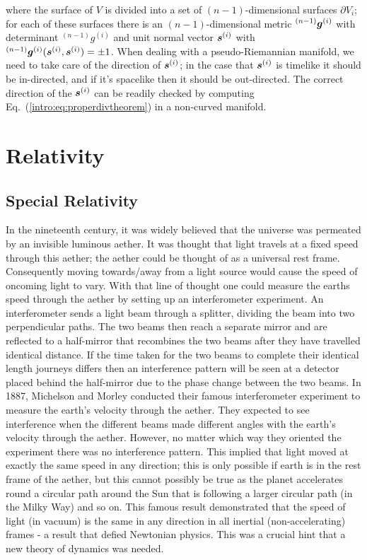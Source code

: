 where the surface of $V$ is divided into a set of $(n-1)$-dimensional surfaces $\partial V_i$; for each of these surfaces there is an $(n-1)$-dimensional metric ${}^{(n-1)}\boldsymbol{g}^{(i)}$ with determinant ${}^{(n-1)} g ^{(i)}$ and unit normal vector $\boldsymbol{s}^{(i)}$ with ${}^{(n-1)}\boldsymbol{g}^{(i)}(\boldsymbol{s}^{(i)},\boldsymbol{s}^{(i)})=\pm 1$. When dealing with a pseudo-Riemannian manifold, we need to take care of the direction of $\boldsymbol{s}^{(i)}$; in the case that $\boldsymbol{s}^{(i)}$ is timelike it should be in-directed, and if it's spacelike then it should be out-directed. The correct direction of the $\boldsymbol{s}^{(i)}$ can be readily checked by computing Eq.~(\ref{intro:eq:properdivtheorem}) in a non-curved manifold.

\newpage
\section{Relativity}

\subsection{Special Relativity}

In the nineteenth century, it was widely believed that the universe was permeated by an invisible luminous aether. It was thought that light travels at a fixed speed through this aether; the aether could be thought of as a universal rest frame. Consequently moving towards/away from a light source would cause the speed of oncoming light to vary. With that line of thought one could measure the earths speed through the aether by setting up an interferometer experiment. An interferometer sends a light beam through a splitter, dividing the beam into two perpendicular paths. The two beams then reach a separate mirror and are reflected to a half-mirror that recombines the two beams after they have travelled identical distance. If the time taken for the two beams to complete their identical length journeys differs then an interference pattern will be seen at a detector placed behind the half-mirror due to the phase change between the two beams. In 1887, Michelson and Morley conducted their famous interferometer experiment to measure the earth's velocity through the aether. They expected to see interference when the different beams made different angles with the earth's velocity through the aether. However, no matter which way they oriented the experiment there was no interference pattern. This implied that light moved at exactly the same speed in any direction; this is only possible if earth is in the rest frame of the aether, but this cannot possibly be true as the planet accelerates round a circular path around the Sun that is following a larger circular path (in the Milky Way) and so on. This famous result demonstrated that the speed of light (in vacuum) is the same in any direction in all inertial (non-accelerating) frames - a result that defied Newtonian physics. This was a crucial hint that a new theory of dynamics was needed. 

